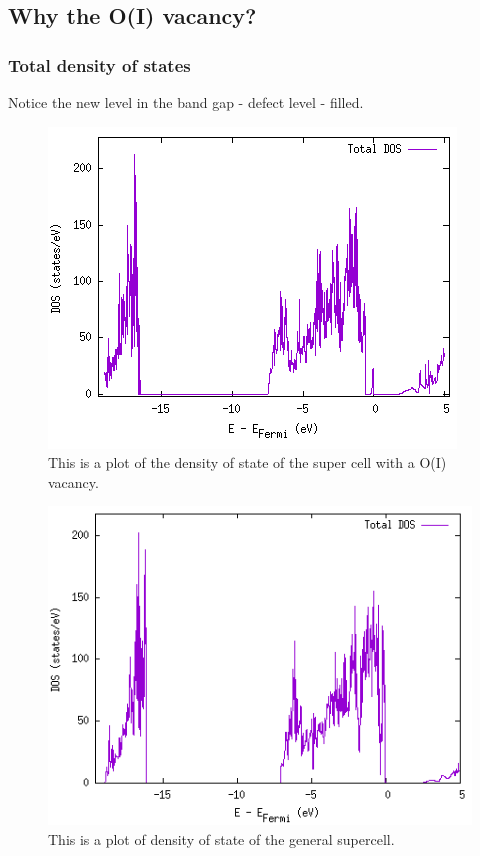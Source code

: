 \subsection{Why the O(I) vacancy?}


\subsubsection{Total density of states}

Notice the new level in the band gap - defect level - filled.

\begin{figure}[H]
\includegraphics[width=\linewidth]{../fig/dosplot/total_dos_O_I_vacancy}\caption{This is a plot of the density of state of the super cell with a O(I) vacancy.}\label{fig:total_dos_vac}
\end{figure}

\begin{figure}[H]
\includegraphics[width=\linewidth]{../fig/dosplot/total_dos_supercell}\caption{This is a plot of density of state of the general supercell.}\label{fig:total_dos_supercell}
\end{figure}


